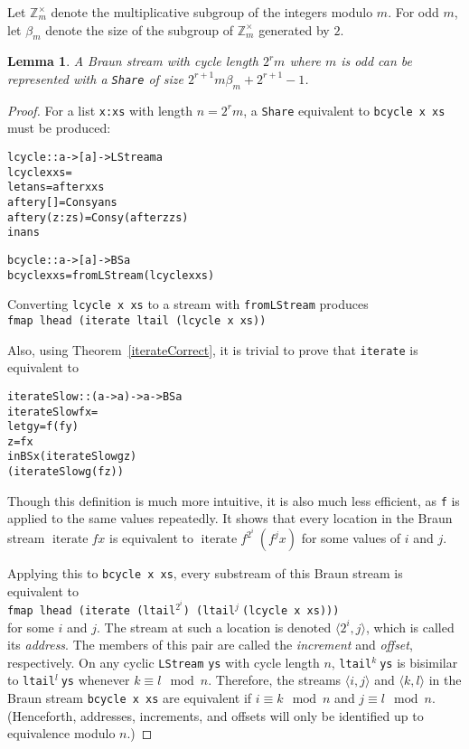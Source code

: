 \documentclass[envcountsect]{llncs}
\DeclareMathOperator{\iter}{iterate}
\newcommand{\share}{{\tt Share} }
\newtheorem{lemma}[theorem]{Lemma}
\begin{document}
Let $\mathbb{Z}_m^{\times}$ denote the multiplicative subgroup of the integers modulo $m$.
For odd $m$, let $\beta_m$ denote the size of the subgroup of $\mathbb{Z}_m^{\times}$ generated by $2$.
\begin{lemma}
\label{cycleSize}
A Braun stream with cycle length $2^r m$ where $m$ is odd can be represented with a \share of size $2^{r+1} m \beta_m + 2^{r+1} - 1$.
\end{lemma}
\begin{proof}
For a list {\tt x:xs} with length $n = 2^r m$, a \share equivalent to {\tt bcycle x xs} must be produced:

\begin{alltt}
lcycle :: a -> [a] -> LStream a
lcycle x xs = 
  let ans = after x xs
      after y [] = Cons y ans
      after y (z:zs) = Cons y (after z zs)
  in ans

bcycle :: a -> [a] -> BS a
bcycle x xs = fromLStream (lcycle x xs)
\end{alltt}

Converting {\tt lcycle x xs} to a stream with {\tt fromLStream} produces 
\\
{\tt fmap lhead (iterate ltail (lcycle x xs))}

Also, using Theorem~\ref{iterateCorrect}, it is trivial to prove that {\tt iterate} is equivalent to

\begin{alltt}
iterateSlow :: (a -> a) -> a -> BS a
iterateSlow f x =
  let g y = f (f y)
      z = f x
  in BS x (iterateSlow g    z) 
          (iterateSlow g (f z))
\end{alltt}

Though this definition is much more intuitive, it is also much less efficient, as {\tt f} is applied to the same values repeatedly.
It shows that every location in the Braun stream $\iter f x$ is equivalent to $\iter f^{2^i}\ (f^j x)$ for some values of $i$ and $j$.

Applying this to {\tt bcycle x xs}, every substream of this Braun stream is equivalent to 
\\
{\tt fmap lhead (iterate (ltail}$^{2^i}${\tt ) (ltail}$^j\ ${\tt (lcycle x xs)))} 
\\
for some $i$ and $j$.
The stream at such a location is denoted $\langle 2^i,j \rangle$, which is called its {\em address}.
The members of this pair are called the {\em increment} and {\em offset}, respectively.
On any cyclic {\tt LStream} {\tt ys} with cycle length $n$, {\tt ltail}$^k\ ${\tt ys} is bisimilar to {\tt ltail}$^l\ ${\tt ys} whenever $k \equiv l \mod n$.
Therefore, the streams $\langle i,j \rangle$ and $\langle k,l \rangle$ in the Braun stream {\tt bcycle x xs} are equivalent if $i \equiv k \mod n$ and $j \equiv l \mod n$.
(Henceforth, addresses, increments, and offsets will only be identified up to equivalence modulo $n$.)



\end{proof}
\end{document}
